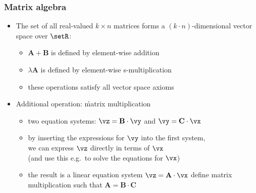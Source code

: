 \begin{frame}
  \frametitle{Matrix algebra}

  \begin{itemize}
  \item The set of all real-valued $k\times n$ matrices forms a $(k\cdot
    n)$-dimensional vector space over $\setR$:
    \begin{itemize}
    \item $\mathbf{A} + \mathbf{B}$ is defined by element-wise addition
    \item $\lambda \mathbf{A}$ is defined by element-wise s-multiplication
    \item these operations satisfy all vector space axioms
    \end{itemize}
    \pause\gap
  \item Additional operation: \h{matrix multiplication}
    \begin{itemize}
    \item two equation systems: $\vz = \mathbf{B}\cdot \vy$ and $\vy = \mathbf{C}\cdot \vx$
    \item by inserting the expressions for $\vy$ into the first system,\\
      we can  express $\vz$ directly in terms of $\vx$\\
      (and use this e.g.\ to solve the equations for $\vx$)
    \item the result is a linear equation system $\vz = \mathbf{A}\cdot \vx$
    \itemhand define matrix multiplication such that $\mathbf{A} = \mathbf{B}\cdot \mathbf{C}$
    \end{itemize}
  \end{itemize}
\end{frame}

